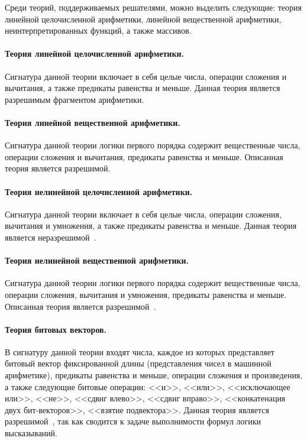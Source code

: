 Среди теорий, поддерживаемых решателями, можно выделить следующие: теория линейной целочисленной арифметики, линейной вещественной арифметики, неинтерпретированных функций, а также массивов.

\paragraph{Теория линейной целочисленной арифметики.} Сигнатура данной теории включает в себя целые числа, операции сложения и вычитания, а также предикаты равенства и меньше. Данная теория является разрешимым фрагментом арифметики.
\paragraph{Теория линейной вещественной арифметики.} Сигнатура данной теории логики первого порядка содержит вещественные числа, операции сложения и вычитания, предикаты равенства и меньше. Описанная теория является разрешимой.
\paragraph{Теория нелинейной целочисленной арифметики.} Сигнатура данной теории включает в себя целые числа, операции сложения, вычитания и умножения, а также предикаты равенства и меньше. Данная теория является неразрешимой~\cite{godel1931formal}.
\paragraph{Теория нелинейной вещественной арифметики.} Сигнатура данной теории логики первого порядка содержит вещественные числа, операции сложения, вычитания и умножения, предикаты равенства и меньше. Описанная теория является разрешимой~\cite{tarski1998decision}.
\paragraph{Теория битовых векторов.} В сигнатуру данной теории входят числа, каждое из которых представляет битовый вектор фиксированной длины (представления чисел в машинной арифметике), предикаты равенства и меньше, операции сложения и произведения, а также следующие битовые операции: <<и>>, <<или>>, <<исключающее или>>, <<не>>, <<сдвиг влево>>, <<сдвиг вправо>>, <<конкатенация двух бит-векторов>>, <<взятие подвектора>>. Данная теория является разрешимой~\cite{barrett1998decision}, так как сводится к задаче выполнимости формул логики высказываний.


